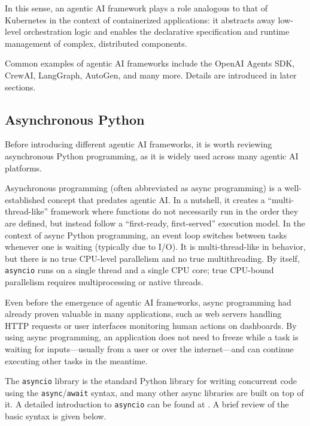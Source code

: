 In this sense, an agentic AI framework plays a role analogous to that of Kubernetes in the context of containerized applications: it abstracts away low-level orchestration logic and enables the declarative specification and runtime management of complex, distributed components.

Common examples of agentic AI frameworks include the OpenAI Agents SDK, CrewAI, LangGraph, AutoGen, and many more. Details are introduced in later sections.

\subsection{Asynchronous Python}

Before introducing different agentic AI frameworks, it is worth reviewing asynchronous Python programming, as it is widely used across many agentic AI platforms.

Asynchronous programming (often abbreviated as async programming) is a well-established concept that predates agentic AI. In a nutshell, it creates a ``multi-thread-like'' framework where functions do not necessarily run in the order they are defined, but instead follow a ``first-ready, first-served'' execution model. In the context of async Python programming, an event loop switches between tasks whenever one is waiting (typically due to I/O). It is multi-thread-like in behavior, but there is no true CPU-level parallelism and no true multithreading. By itself, \verb|asyncio| runs on a single thread and a single CPU core; true CPU-bound parallelism requires multiprocessing or native threads.

Even before the emergence of agentic AI frameworks, async programming had already proven valuable in many applications, such as web servers handling HTTP requests or user interfaces monitoring human actions on dashboards. By using async programming, an application does not need to freeze while a task is waiting for inputs—usually from a user or over the internet—and can continue executing other tasks in the meantime.

The \verb|asyncio| library is the standard Python library for writing concurrent code using the \verb|async|/\verb|await| syntax, and many other async libraries are built on top of it. A detailed introduction to \verb|asyncio| can be found at \cite{python2025asyncio}. A brief review of the basic syntax is given below.

